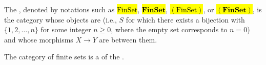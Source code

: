 \begin{definition} \label{definition:category_of_finite_sets}
    The , denoted by notations such as \hl{$\mathrm{FinSet}$}, \hl{$\mathbf{FinSet}$}, \hl{$(\mathrm{FinSet})$}, or \hl{$(\mathbf{FinSet})$}, is the category whose objects are  (i.e.,  $S$ for which there exists a bijection with $\{1, 2, \dots, n\}$ for some integer $n \geq 0$, where the empty set corresponds to $n = 0$) and whose morphisms $X \to Y$ are  between them.

    The category of finite sets is a   of the .

\end{definition}
